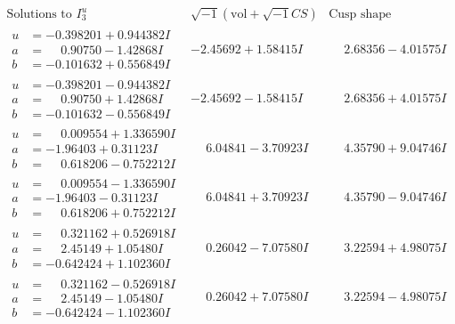 \documentclass[1p]{elsarticle_modified}
\theoremstyle{definition}
\newcommand{\I}{\sqrt{-1}}
\begin{document}
$$\begin{array}{c|c|c}  
\text{Solutions to }I^u_{3}& \I (\text{vol} + \sqrt{-1}CS) & \text{Cusp shape}\\
 \hline 
\begin{aligned}
u &= -0.398201 + 0.944382 I \\
a &= \phantom{-}0.90750 - 1.42868 I \\
b &= -0.101632 + 0.556849 I\end{aligned}
 & -2.45692 + 1.58415 I & \phantom{-}2.68356 - 4.01575 I \\ \hline\begin{aligned}
u &= -0.398201 - 0.944382 I \\
a &= \phantom{-}0.90750 + 1.42868 I \\
b &= -0.101632 - 0.556849 I\end{aligned}
 & -2.45692 - 1.58415 I & \phantom{-}2.68356 + 4.01575 I \\ \hline\begin{aligned}
u &= \phantom{-}0.009554 + 1.336590 I \\
a &= -1.96403 + 0.31123 I \\
b &= \phantom{-}0.618206 - 0.752212 I\end{aligned}
 & \phantom{-}6.04841 - 3.70923 I & \phantom{-}4.35790 + 9.04746 I \\ \hline\begin{aligned}
u &= \phantom{-}0.009554 - 1.336590 I \\
a &= -1.96403 - 0.31123 I \\
b &= \phantom{-}0.618206 + 0.752212 I\end{aligned}
 & \phantom{-}6.04841 + 3.70923 I & \phantom{-}4.35790 - 9.04746 I \\ \hline\begin{aligned}
u &= \phantom{-}0.321162 + 0.526918 I \\
a &= \phantom{-}2.45149 + 1.05480 I \\
b &= -0.642424 + 1.102360 I\end{aligned}
 & \phantom{-}0.26042 - 7.07580 I & \phantom{-}3.22594 + 4.98075 I \\ \hline\begin{aligned}
u &= \phantom{-}0.321162 - 0.526918 I \\
a &= \phantom{-}2.45149 - 1.05480 I \\
b &= -0.642424 - 1.102360 I\end{aligned}
 & \phantom{-}0.26042 + 7.07580 I & \phantom{-}3.22594 - 4.98075 I \\ \hline\begin{aligned}

\end{aligned}
\end{array}$$
\end{document}

